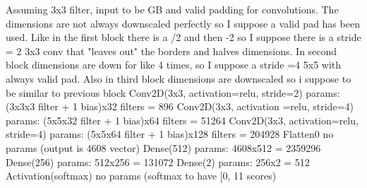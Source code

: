 \begin{box-stud}
    Assuming 3x3 filter, input to be GB and valid padding for convolutions. The dimensions are not always downscaled perfectly so I suppose a valid pad has been used. Like in the first block there is a /2 and then -2 so I suppose there is a stride = 2 3x3 conv that "leaves out" the borders and halves dimensions. In second block dimensions are down for like 4 times, so I suppose a stride =4 5x5 with always valid pad. Also in third block dimensions are downscaled so i suppose to be similar to previous block
    Conv2D(3x3, activation=relu, stride=2) params: (3x3x3 filter + 1 bias)x32 filters = 896
    Conv2D(3x3, activation =relu, stride=4) params: (5x5x32 filter + 1 bias)x64 filters = 51264
    Conv2D(3x3, activation=relu, stride=4) params: (5x5x64 filter + 1 bias)x128 filters = 204928
    Flatten0 no params (output is 4608 vector)
    Dense(512) params: 4608x512 = 2359296
    Dense(256) params: 512x256 = 131072
    Dense(2) params: 256x2 = 512
    Activation(softmax) no params
    (softmax to have [0, 11 scores)
\end{box-stud}








